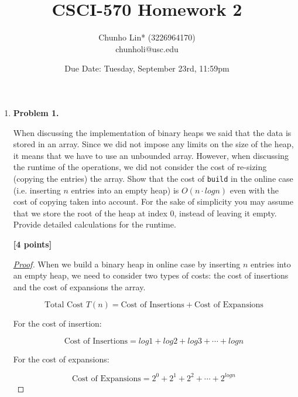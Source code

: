 \documentclass[11pt]{article}
\begin{document}
\author{Chunho Lin* (3226964170)\\chunholi@usc.edu}
\title{CSCI-570 Homework 2}
\date{Due Date: Tuesday, September 23rd, 11:59pm}

\maketitle

\medskip

\begin{enumerate}

\item \textbf{Problem 1.}

When discussing the implementation of binary heaps we said that the data is stored in an array. Since we did not impose any limits on the size of the heap, it means that we have to use an unbounded array. However, when discussing the runtime of the operations, we did not consider the cost of re-sizing (copying the entries) the array. Show that the cost of \texttt{build} in the online case (i.e. inserting \(n\) entries into an empty heap) is \(O(n \cdot log n)\) even with the cost of copying taken into account. For the sake of simplicity you may assume that we store the root of the heap at index 0, instead of leaving it empty. Provide detailed calculations for the runtime.

\begin{flushright}
\end{flushright}

\begin{flushright}
\textbf{[4 points]}
\end{flushright}

\begin{proof}[\underline{Proof}]

When we build a binary heap in online case by inserting \(n\) entries into an empty heap, we need to consider two types of costs: the cost of insertions and the cost of expansions the array.

\[
\text{Total Cost } T(n) = \text{Cost of Insertions} + \text{Cost of Expansions}
\]

For the cost of insertion:

\[
\text{Cost of Insertions} = log 1 + log 2 + log 3 + \cdots + log n
\]

For the cost of expansions:

\[
\text{Cost of Expansions} = 2^0 + 2^1 + 2^2 + \cdots + 2^{log n}
\]



\end{proof}
\end{enumerate}
\end{document}
